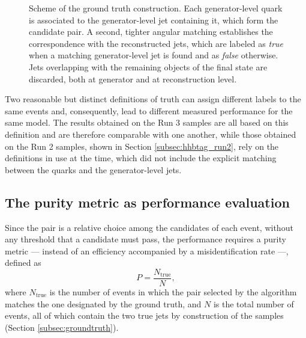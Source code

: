 \begin{figure}[t]
\caption{Scheme of the ground truth construction. Each generator-level quark is associated to the generator-level jet containing it, which form the candidate pair. A second, tighter angular matching establishes the correspondence with the reconstructed jets, which are labeled as \textit{true} when a matching generator-level jet is found and as \textit{false} otherwise. Jets overlapping with the remaining objects of the final state are discarded, both at generator and at reconstruction level. }
\label{fig:groundtruth}
\end{figure}



Two reasonable but distinct definitions of truth can assign different labels to the same events and, consequently, lead to different measured performance for the same model. The results obtained on the Run 3 samples are all based on this definition and are therefore comparable with one another, while those obtained on the Run 2 samples, shown in Section \ref{subsec:hhbtag_run2}, rely on the definitions in use at the time, which did not include the explicit matching between the quarks and the generator-level jets.


\subsection{The purity metric as performance evaluation}
\label{subsec:metric}
%
Since the pair is a relative choice among the candidates of each event, without any threshold that a candidate must pass, the performance requires a purity metric — instead of an efficiency accompanied by a misidentification rate —, defined as
%
\begin{equation}
P = \frac{N_{\mathrm{true}}}{N},
\label{eq:purity}
\end{equation}
%
where $N_{\mathrm{true}}$ is the number of events in which the pair selected by the algorithm matches the one designated by the ground truth, and $N$ is the total number of events, all of which contain the two true jets by construction of the samples (Section \ref{subsec:groundtruth}).

